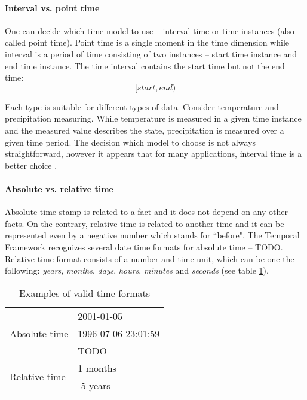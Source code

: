 \documentclass[a4paper,12pt]{article}
\newcommand{\tf}{Temporal Framework\xspace}
\begin{document}
\paragraph{Interval vs. point time}
\label{sec:intervalVsPoint}
One can decide which time model to use -- interval time or time instances (also called point time).
Point time is a single moment in the time dimension
while interval is a period of time consisting of two instances -- start time instance and end time instance.
The time interval contains the start time but not the end time:
$$[start, end)$$

Each type is suitable for different types of data.
Consider temperature and precipitation measuring.
While temperature is measured in a given time instance and the measured value describes the state,
precipitation is measured over a given time period. The decision which model to choose is not always
straightforward, however it appears that for many applications,
interval time is a better choice \cite{pointVsInterval}.

\paragraph{Absolute vs. relative time}
\label{sec:absoluteVsRelative}
Absolute time stamp is related to a fact and it does not depend on any other facts.
On the contrary, relative time is related to another time and
it can be represented even by a negative number which stands for ``before".
The \tf recognizes several date time formats for absolute time -- TODO.
Relative time format consists of a number and time unit, which can be one the following: \emph{years},
\emph{months}, \emph{days}, \emph{hours}, \emph{minutes} and \emph{seconds} (see table \ref{tab:timeFormat}).

\begin{table}[h!]
  \centering
\setlength{\extrarowheight}{3pt}
\begin{tabular}{|l|l|}
\hline
\multirow{3}{*}{Absolute time}
 & 2001-01-05  \\ \cline{2-2}
 & 1996-07-06 23:01:59  \\\cline{2-2}
 & TODO  \\
 \hline
\multirow{2}{*}{Relative time}
 & 1 months  \\\cline{2-2}
 & -5 years  \\
 \hline
\end{tabular}

  \caption{Examples of valid time formats}
  \label{tab:timeFormat}
\end{table}
\end{document}
